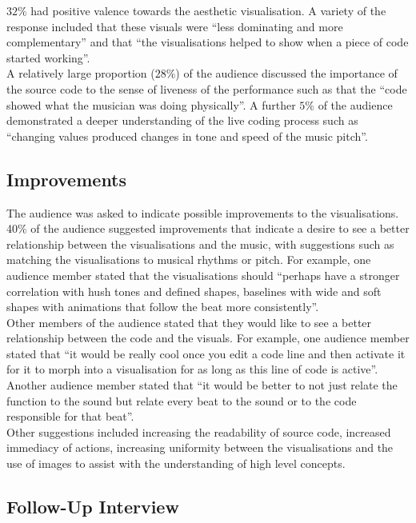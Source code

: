 $32\%$ had positive valence towards the aesthetic visualisation. A variety of the response included that these visuals were ``less dominating and more complementary'' and that ``the visualisations helped to show when a piece of code started working''.\\

A relatively large proportion ($28\%$) of the audience discussed the importance of the source code to the sense of liveness of the performance such as that the ``code showed what the musician was doing physically''. A further $5\%$ of the audience demonstrated a deeper understanding of the live coding process such as ``changing values produced changes in tone and speed of the music pitch''.\\

\subsection{Improvements}

The audience was asked to indicate possible improvements to the visualisations. 40\% of the audience suggested improvements that indicate a desire to see a better relationship between the visualisations and the music, with suggestions such as matching the visualisations to musical rhythms or pitch. For example, one audience member stated that the visualisations should ``perhaps have a stronger correlation with hush tones and defined shapes, baselines with wide and soft shapes with animations that follow the beat more consistently''.\\

Other members of the audience stated that they would like to see a better relationship between the code and the visuals. For example, one audience member stated that ``it would be really cool once you edit a code line and then activate it for it to morph into a visualisation for as long as this line of code is active''. Another audience member stated that ``it would be better to not just relate the function to the sound but relate every beat to the sound or to the code responsible for that beat''.\\

Other suggestions included increasing the readability of source code, increased immediacy of actions, increasing uniformity between the visualisations and the use of images to assist with the understanding of high level concepts.\\

\subsection{Follow-Up Interview}

